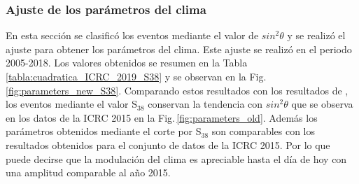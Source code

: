 \subsubsection{Ajuste de los parámetros del clima}

En esta sección se clasificó los eventos mediante el valor de $sin^2\theta$ y se realizó el ajuste para obtener los parámetros del clima. Este ajuste se realizó en el periodo 2005-2018. Los valores obtenidos se resumen en la Tabla\,\ref{tabla:cuadratica_ICRC_2019_S38} y se  observan en la Fig.\,\ref{fig:parameters_new_S38}. Comparando estos resultados con los resultados de \cite{aab2017impact}, los eventos mediante el valor S$_{38}$  conservan la tendencia con $sin^2\theta$ que se observa en los datos de la ICRC 2015 en la Fig.\,\ref{fig:parameters_old}. Además los parámetros obtenidos mediante el corte por S$_{38}$ son comparables con los resultados obtenidos para el conjunto de datos de la ICRC 2015. Por lo que puede decirse que la modulación del clima es apreciable  hasta el día de hoy con una amplitud comparable al año 2015.

